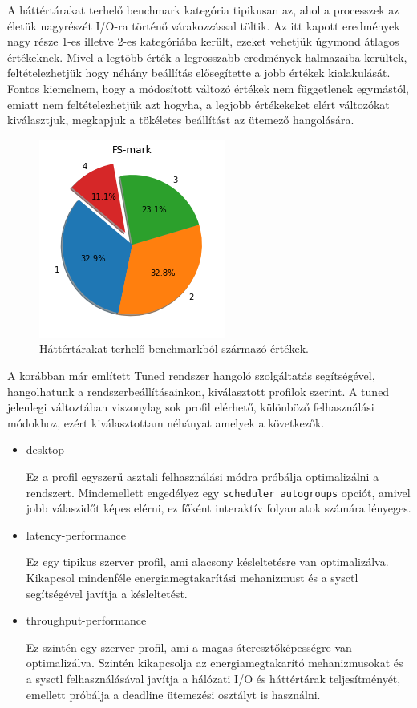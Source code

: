A háttértárakat terhelő benchmark kategória tipikusan az, ahol a processzek az életük nagyrészét I/O-ra történő várakozzással töltik.
Az itt kapott eredmények nagy része 1-es illetve 2-es kategóriába került, ezeket vehetjük úgymond átlagos értékeknek. Mivel a legtöbb érték a legrosszabb eredmények halmazaiba kerültek, feltételezhetjük hogy néhány beállítás elősegítette a jobb értékek kialakulását. 
Fontos kiemelnem, hogy a módosított változó értékek nem függetlenek egymástól, emiatt nem feltételezhetjük azt hogyha, a legjobb értékekeket elért változókat kiválasztjuk, megkapjuk a tökéletes beállítást az ütemező hangolására.

\begin{figure}[h!]
\centering
\includegraphics[scale=0.6]{images/diskBenchmarkValue.png}
\caption{Háttértárakat terhelő benchmarkból származó értékek.}
\label{fig:diskChart}
\end{figure}


A korábban már említett Tuned rendszer hangoló szolgáltatás segítségével, hangolhatunk a rendszerbeállításainkon, kiválasztott profilok szerint.
A tuned jelenlegi változtában viszonylag sok profil elérhető, különböző felhasználási módokhoz, ezért kiválasztottam néhányat amelyek a következők.
\begin{itemize}
\item desktop

Ez a profil egyszerű asztali felhasználási módra próbálja optimalizálni a rendszert.
Mindemellett engedélyez egy \texttt{scheduler autogroups} opciót, amivel jobb válaszidőt képes elérni, ez főként interaktív folyamatok számára lényeges.

\item latency-performance

Ez egy tipikus szerver profil, ami alacsony késleltetésre van optimalizálva. Kikapcsol mindenféle energiamegtakarítási mehanizmust és a sysctl segítségével javítja a késleltetést.

\item throughput-performance

Ez szintén egy szerver profil, ami a magas áteresztőképességre van optimalizálva.
Szintén kikapcsolja az energiamegtakarító mehanizmusokat és a sysctl felhasználásával javítja a hálózati I/O és háttértárak teljesítményét, emellett próbálja a deadline ütemezési osztályt is használni.
\end{itemize}

